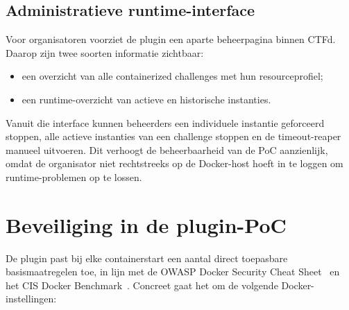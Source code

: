 \subsection{Administratieve runtime-interface}

Voor organisatoren voorziet de plugin een aparte beheerpagina binnen CTFd. Daarop zijn twee soorten informatie zichtbaar:

\begin{itemize}
  \item een overzicht van alle containerized challenges met hun resourceprofiel;
  \item een runtime-overzicht van actieve en historische instanties.
\end{itemize}

Vanuit die interface kunnen beheerders een individuele instantie geforceerd stoppen, alle actieve instanties van een challenge stoppen en de timeout-reaper manueel uitvoeren. Dit verhoogt de beheerbaarheid van de PoC aanzienlijk, omdat de organisator niet rechtstreeks op de Docker-host hoeft in te loggen om runtime-problemen op te lossen.

\clearpage

\section{Beveiliging in de plugin-PoC}%
\label{sec:poc-beveiliging}

De plugin past bij elke containerstart een aantal direct toepasbare basismaatregelen toe, in lijn met de OWASP Docker Security Cheat Sheet~\autocite{OWASP2024} en het CIS Docker Benchmark~\autocite{CISDocker}. Concreet gaat het om de volgende Docker-instellingen:

